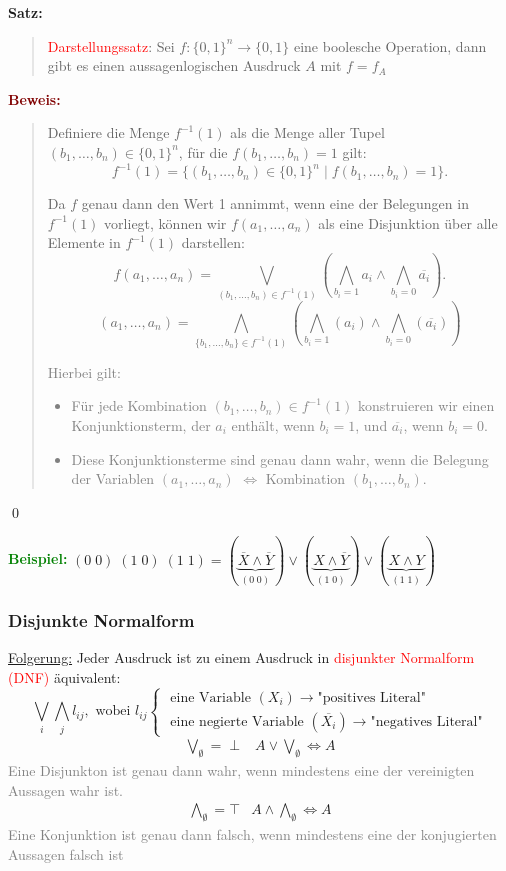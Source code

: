 \documentclass{article}
\newcommand{\red}[1]{\textcolor{red}{#1}}
\newcommand{\gray}[1]{\textcolor{gray}{#1}}
\newcommand{\green}[1]{\textcolor{green}{#1}}
\newcommand{\dgr}[1]{\textcolor{dgr}{#1}}
\newcommand{\maroon}[1]{\textcolor{maroon}{#1}}
\newcommand{\ex}{\green{\textbf{Beispiel: }}}
\newcommand{\se}[1]{\dgr{\textbf{Satz: }}\begin{quote}#1\end{quote}}
\newcommand{\pr}[1]{\maroon{\textbf{Beweis: }}\begin{quote}#1\end{quote}\qed}
\newcommand{\n}[1]{\overline{#1}}
\begin{document}
\se{\red{Darstellungssatz}: Sei $f: \{0, 1\}^n \to \{0, 1\}$ eine boolesche Operation, dann gibt es einen aussagenlogischen Ausdruck $A$ mit $f = f_A$}
\pr{
    Definiere die Menge \( f^{-1}(1) \) als die Menge aller Tupel \( (b_1, \dots, b_n) \in \{0, 1\}^n \), für die \( f(b_1, \dots, b_n) = 1 \) gilt:
    \[
    f^{-1}(1) = \{(b_1, \dots, b_n) \in \{0, 1\}^n \mid f(b_1, \dots, b_n) = 1\}.
    \]

    Da \( f \) genau dann den Wert 1 annimmt, wenn eine der Belegungen in \( f^{-1}(1) \) vorliegt, können wir \( f(a_1, \dots, a_n) \) als eine Disjunktion über alle Elemente in \( f^{-1}(1) \) darstellen:
    \[
    f(a_1, \dots, a_n) = \bigvee_{(b_1, \dots, b_n) \in f^{-1}(1)} \left( \bigwedge_{b_i = 1} a_i \land \bigwedge_{b_i = 0} \n{a_i} \right).
    \]
    \[
    (a_1, \dots, a_n) = \bigwedge_{\{b_1, \dots, b_n\} \in f^{-1}(1)} (\bigwedge_{b_i = 1} (a_i) \land \bigwedge_{b_i = 0} (\n{a_i}))
    \]

    \gray{Hierbei gilt:
    \begin{itemize}
        \item Für jede Kombination \( (b_1, \dots, b_n) \in f^{-1}(1) \) konstruieren wir einen Konjunktionsterm, der \( a_i \) enthält, wenn \( b_i = 1 \), und \( \n{a_i} \), wenn \( b_i = 0 \).
        \item Diese Konjunktionsterme sind genau dann wahr, wenn die Belegung der Variablen \( (a_1, \dots, a_n) \) $\iff$ Kombination \( (b_1, \dots, b_n) \).
    \end{itemize}}
}

\newpage
\ex $(0 \; 0) \; (1 \; 0) \; (1 \; 1) = (\underbrace{\n{X} \land \n{Y}}_{(0 \; 0)}) \lor (\underbrace{X \land \n{Y}}_{(1 \; 0)}) \lor (\underbrace{X \land Y}_{(1 \; 1)})$

\subsubsection{Disjunkte Normalform}

\underline{Folgerung:} Jeder Ausdruck ist zu einem Ausdruck in \red{disjunkter Normalform (DNF)} äquivalent:
\[
    \bigvee_i \bigwedge_j l_{ij}, \text{ wobei } l_{ij} \begin{cases}
        \text{ eine Variable } (X_i) \to \text{"positives Literal"}\\
        \text{ eine negierte Variable } (\n{X_i}) \to \text{"negatives Literal"}
    \end{cases}
\]
\[
    \begin{array}{lcl}
        \bigvee_{\emptyset} = \perp & A \lor \bigvee_{\emptyset} \iff A
    \end{array}
\]
\gray{Eine Disjunkton ist genau dann wahr, wenn mindestens eine der vereinigten Aussagen wahr ist.}
\[
    \begin{array}{lcl}
        \bigwedge_{\emptyset} = \top & A \land \bigwedge_{\emptyset} \iff A
    \end{array}
\]
\gray{Eine Konjunktion ist genau dann falsch, wenn mindestens eine der konjugierten Aussagen falsch ist}
\end{document}

